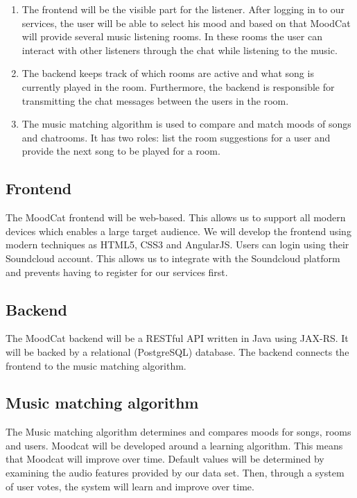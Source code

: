 \documentclass[10pt,a4paper]{article}
\begin{document}
\begin{enumerate}
\item The frontend will be the visible part for the listener.
After logging in to our services, the user will be able to select his mood and based on that MoodCat will provide several music listening rooms.
In these rooms the user can interact with other listeners through the chat while listening to the music.

\item The backend keeps track of which rooms are active and what song is currently played in the room.
Furthermore, the backend is responsible for transmitting the chat messages between the users in the room.

\item The music matching algorithm is used to compare and match moods of songs and chatrooms.
It has two roles: list the room suggestions for a user and provide the next song to be played for a room.
\end{enumerate}

\newpage

\subsection{Frontend}

The MoodCat frontend will be web-based.
This allows us to support all modern devices which enables a large target audience.
We will develop the frontend using modern techniques as HTML5\cite{HTML}, CSS3\cite{CSS} and AngularJS\cite{AngularJS}.
Users can login using their Soundcloud account.
This allows us to integrate with the Soundcloud platform and prevents having to register for our services first.

\subsection{Backend}

The MoodCat backend will be a RESTful API written in Java using JAX-RS. It will be backed by a relational (PostgreSQL) database. The backend connects the frontend to the music matching algorithm.

\subsection{Music matching algorithm}

The Music matching algorithm determines and compares moods for songs, rooms and users.
Moodcat will be developed around a learning algorithm.
This means that Moodcat will improve over time.
Default values will be determined by examining the audio features provided by our data set.
Then, through a system of user votes, the system will learn and improve over time.
\end{document}
